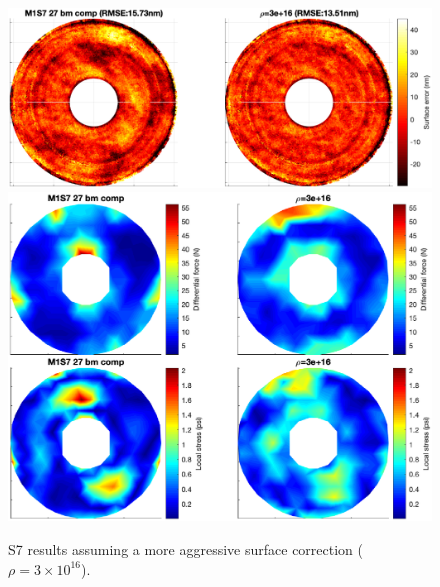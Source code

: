 \documentclass{gmto}
\begin{document}
\begin{figure}[!p]
\centering
\includegraphics[width=\textwidth]{./pictures/s7_surfaceRMSE_rho3e16.eps}
\vfill
\includegraphics[width=\textwidth]{./pictures/s7_NG_sigma_rho3e16.eps}
\caption[\textsf{S7} results assuming a more aggressive surface correction]{\textsf{S7} results assuming a more aggressive surface correction ($\rho=3\times10^{16}$).}
\label{fig:s7_altrho_results}
\end{figure}
\end{document}
